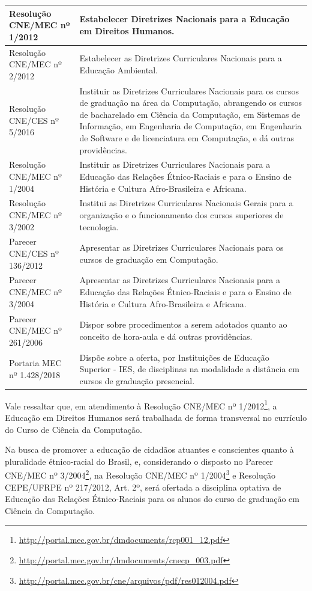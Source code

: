 \documentclass[
	12pt,				%
	openright,			%
  oneside,     %
	a4paper,			%
	chapter=TITLE,		%
	english,			%
	french,				%
	spanish,			%
	brazil				%
	]{abntex2}
\begin{document}
\begin{center}
\begin{scriptsize}
\begin{longtable}{@{}lp{8.7cm}}
    Resolução CNE/MEC nº 1/2012 & Estabelecer Diretrizes Nacionais para a Educação em Direitos Humanos.\\ \midrule
    Resolução CNE/MEC nº 2/2012 & Estabelecer as Diretrizes Curriculares Nacionais para a Educação Ambiental. \\ \midrule
    Resolução CNE/CES nº 5/2016	& Instituir as Diretrizes Curriculares Nacionais para os cursos de graduação na área da Computação, abrangendo os cursos de bacharelado em Ciência da Computação, em Sistemas de Informação, em Engenharia de Computação, em Engenharia de Software e de licenciatura em Computação, e dá outras providências.\\ \midrule
    Resolução CNE/MEC nº 1/2004	& Instituir as Diretrizes Curriculares Nacionais para a Educação das Relações Étnico-Raciais e para o Ensino de História e Cultura Afro-Brasileira e Africana. \\ \midrule
    Resolução CNE/MEC nº 3/2002 & Institui	as Diretrizes Curriculares Nacionais Gerais para a organização e o funcionamento dos cursos superiores de tecnologia. \\ \midrule
    Parecer CNE/CES nº 136/2012	& Apresentar as Diretrizes Curriculares Nacionais para os cursos de graduação em Computação. \\ \midrule
    Parecer CNE/MEC nº 3/2004 & Apresentar as Diretrizes Curriculares Nacionais para a Educação das	Relações Étnico-Raciais e para o Ensino de História e Cultura Afro-Brasileira e Africana. \\ \midrule
    Parecer CNE/MEC nº 261/2006	& Dispor sobre procedimentos a serem adotados quanto ao conceito de hora-aula e dá outras providências. \\ \midrule
    Portaria MEC nº 1.428/2018	& Dispõe sobre a oferta, por Instituições de Educação Superior - IES, de disciplinas na modalidade a distância em cursos de graduação presencial. \\
    \bottomrule
    \end{longtable}
\end{scriptsize}      
\end{center}


Vale ressaltar que, em atendimento à Resolução CNE/MEC nº 1/2012\footnote{\url{http://portal.mec.gov.br/dmdocuments/rcp001_12.pdf}}, a Educação em Direitos Humanos será trabalhada de forma transversal no currículo do Curso de Ciência da Computação.

Na busca de promover a educação de cidadãos atuantes e conscientes quanto à pluralidade étnico-racial do Brasil, e, considerando o disposto no Parecer CNE/MEC nº 3/2004\footnote{\url{http://portal.mec.gov.br/dmdocuments/cnecp_003.pdf}}, na Resolução CNE/MEC nº 1/2004\footnote{\url{http://portal.mec.gov.br/cne/arquivos/pdf/res012004.pdf}} e Resolução CEPE/UFRPE nº 217/2012, Art. 2º, será ofertada a disciplina optativa de Educação das Relações Étnico-Raciais para os alunos do curso de graduação em Ciência da Computação.
\end{document}
